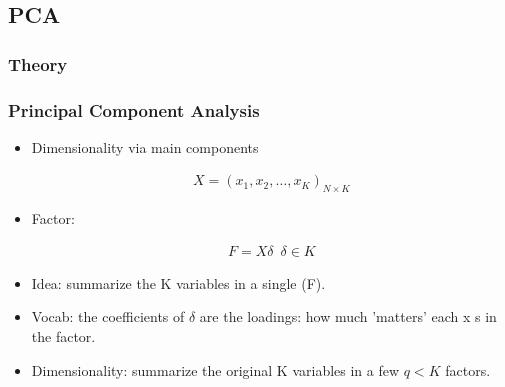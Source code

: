 \documentclass[
  shownotes,
  xcolor={svgnames},
  hyperref={colorlinks,citecolor=DarkBlue,linkcolor=DarkRed,urlcolor=DarkBlue}
  , aspectratio=169]{beamer}
\begin{document}
\subsection{PCA}
\subsubsection{Theory}
\begin{frame}
\frametitle{Principal Component Analysis}

\begin{itemize}

  \item Dimensionality via main components

  \begin{align}
  X = (x_1 , x_2 , \dots , x_K )_{N \times K}
  \end{align}

  \item Factor: 

  \begin{align}
  F = X\delta \,\,\,\delta \in K
  \end{align}


  \item Idea: summarize the K variables in a single (F).
  \item Vocab: the coefficients of $\delta$ are the loadings: how much 'matters' each x s in the factor.
  \item Dimensionality: summarize the original K variables in a few $q <K$ factors.
  \end{itemize}

\end{frame}
\end{document}
